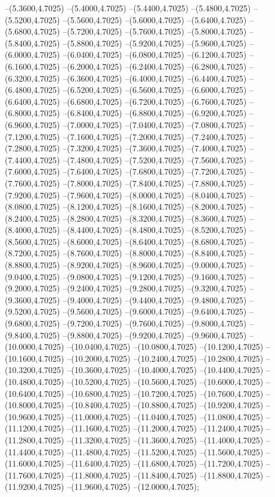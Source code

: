 {	--(5.3600,4.7025)
	--(5.4000,4.7025)
	--(5.4400,4.7025)
	--(5.4800,4.7025)
	--(5.5200,4.7025)
	--(5.5600,4.7025)
	--(5.6000,4.7025)
	--(5.6400,4.7025)
	--(5.6800,4.7025)
	--(5.7200,4.7025)
	--(5.7600,4.7025)
	--(5.8000,4.7025)
	--(5.8400,4.7025)
	--(5.8800,4.7025)
	--(5.9200,4.7025)
	--(5.9600,4.7025)
	--(6.0000,4.7025)
	--(6.0400,4.7025)
	--(6.0800,4.7025)
	--(6.1200,4.7025)
	--(6.1600,4.7025)
	--(6.2000,4.7025)
	--(6.2400,4.7025)
	--(6.2800,4.7025)
	--(6.3200,4.7025)
	--(6.3600,4.7025)
	--(6.4000,4.7025)
	--(6.4400,4.7025)
	--(6.4800,4.7025)
	--(6.5200,4.7025)
	--(6.5600,4.7025)
	--(6.6000,4.7025)
	--(6.6400,4.7025)
	--(6.6800,4.7025)
	--(6.7200,4.7025)
	--(6.7600,4.7025)
	--(6.8000,4.7025)
	--(6.8400,4.7025)
	--(6.8800,4.7025)
	--(6.9200,4.7025)
	--(6.9600,4.7025)
	--(7.0000,4.7025)
	--(7.0400,4.7025)
	--(7.0800,4.7025)
	--(7.1200,4.7025)
	--(7.1600,4.7025)
	--(7.2000,4.7025)
	--(7.2400,4.7025)
	--(7.2800,4.7025)
	--(7.3200,4.7025)
	--(7.3600,4.7025)
	--(7.4000,4.7025)
	--(7.4400,4.7025)
	--(7.4800,4.7025)
	--(7.5200,4.7025)
	--(7.5600,4.7025)
	--(7.6000,4.7025)
	--(7.6400,4.7025)
	--(7.6800,4.7025)
	--(7.7200,4.7025)
	--(7.7600,4.7025)
	--(7.8000,4.7025)
	--(7.8400,4.7025)
	--(7.8800,4.7025)
	--(7.9200,4.7025)
	--(7.9600,4.7025)
	--(8.0000,4.7025)
	--(8.0400,4.7025)
	--(8.0800,4.7025)
	--(8.1200,4.7025)
	--(8.1600,4.7025)
	--(8.2000,4.7025)
	--(8.2400,4.7025)
	--(8.2800,4.7025)
	--(8.3200,4.7025)
	--(8.3600,4.7025)
	--(8.4000,4.7025)
	--(8.4400,4.7025)
	--(8.4800,4.7025)
	--(8.5200,4.7025)
	--(8.5600,4.7025)
	--(8.6000,4.7025)
	--(8.6400,4.7025)
	--(8.6800,4.7025)
	--(8.7200,4.7025)
	--(8.7600,4.7025)
	--(8.8000,4.7025)
	--(8.8400,4.7025)
	--(8.8800,4.7025)
	--(8.9200,4.7025)
	--(8.9600,4.7025)
	--(9.0000,4.7025)
	--(9.0400,4.7025)
	--(9.0800,4.7025)
	--(9.1200,4.7025)
	--(9.1600,4.7025)
	--(9.2000,4.7025)
	--(9.2400,4.7025)
	--(9.2800,4.7025)
	--(9.3200,4.7025)
	--(9.3600,4.7025)
	--(9.4000,4.7025)
	--(9.4400,4.7025)
	--(9.4800,4.7025)
	--(9.5200,4.7025)
	--(9.5600,4.7025)
	--(9.6000,4.7025)
	--(9.6400,4.7025)
	--(9.6800,4.7025)
	--(9.7200,4.7025)
	--(9.7600,4.7025)
	--(9.8000,4.7025)
	--(9.8400,4.7025)
	--(9.8800,4.7025)
	--(9.9200,4.7025)
	--(9.9600,4.7025)
	--(10.0000,4.7025)
	--(10.0400,4.7025)
	--(10.0800,4.7025)
	--(10.1200,4.7025)
	--(10.1600,4.7025)
	--(10.2000,4.7025)
	--(10.2400,4.7025)
	--(10.2800,4.7025)
	--(10.3200,4.7025)
	--(10.3600,4.7025)
	--(10.4000,4.7025)
	--(10.4400,4.7025)
	--(10.4800,4.7025)
	--(10.5200,4.7025)
	--(10.5600,4.7025)
	--(10.6000,4.7025)
	--(10.6400,4.7025)
	--(10.6800,4.7025)
	--(10.7200,4.7025)
	--(10.7600,4.7025)
	--(10.8000,4.7025)
	--(10.8400,4.7025)
	--(10.8800,4.7025)
	--(10.9200,4.7025)
	--(10.9600,4.7025)
	--(11.0000,4.7025)
	--(11.0400,4.7025)
	--(11.0800,4.7025)
	--(11.1200,4.7025)
	--(11.1600,4.7025)
	--(11.2000,4.7025)
	--(11.2400,4.7025)
	--(11.2800,4.7025)
	--(11.3200,4.7025)
	--(11.3600,4.7025)
	--(11.4000,4.7025)
	--(11.4400,4.7025)
	--(11.4800,4.7025)
	--(11.5200,4.7025)
	--(11.5600,4.7025)
	--(11.6000,4.7025)
	--(11.6400,4.7025)
	--(11.6800,4.7025)
	--(11.7200,4.7025)
	--(11.7600,4.7025)
	--(11.8000,4.7025)
	--(11.8400,4.7025)
	--(11.8800,4.7025)
	--(11.9200,4.7025)
	--(11.9600,4.7025)
	--(12.0000,4.7025);
}
